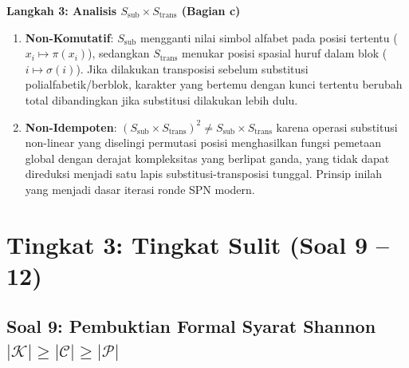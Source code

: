 \documentclass[11pt,a4paper]{article}
\begin{document}
\noindent\textbf{Langkah 3: Analisis $S_{\text{sub}} \times S_{\text{trans}}$ (Bagian c)}
\begin{enumerate}
    \item \textbf{Non-Komutatif}: $S_{\text{sub}}$ mengganti nilai simbol alfabet pada posisi tertentu ($x_i \mapsto \pi(x_i)$), sedangkan $S_{\text{trans}}$ menukar posisi spasial huruf dalam blok ($i \mapsto \sigma(i)$). Jika dilakukan transposisi sebelum substitusi polialfabetik/berblok, karakter yang bertemu dengan kunci tertentu berubah total dibandingkan jika substitusi dilakukan lebih dulu.
    \item \textbf{Non-Idempoten}: $(S_{\text{sub}} \times S_{\text{trans}})^2 \neq S_{\text{sub}} \times S_{\text{trans}}$ karena operasi substitusi non-linear yang diselingi permutasi posisi menghasilkan fungsi pemetaan global dengan derajat kompleksitas yang berlipat ganda, yang tidak dapat direduksi menjadi satu lapis substitusi-transposisi tunggal. Prinsip inilah yang menjadi dasar iterasi ronde SPN modern.
\end{enumerate}

\vspace{0.6cm}

\section{Tingkat 3: Tingkat Sulit (Soal 9 -- 12)}

\subsection{Soal 9: Pembuktian Formal Syarat Shannon \texorpdfstring{$|\mathcal{K}| \ge |\mathcal{C}| \ge |\mathcal{P}|$}{|K| >= |C| >= |P|}}
\end{document}
